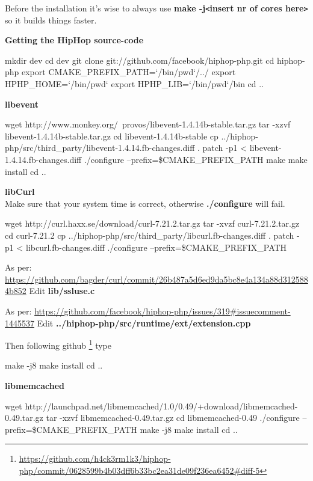 Before the installation it's wise to always use \textbf{make -j\texttt{<}insert nr of cores here\texttt{>}} so it builds things faster.

\textbf{Getting the HipHop source-code}
\begin{codelisting}
mkdir dev
cd dev
git clone git://github.com/facebook/hiphop-php.git
cd hiphop-php
export CMAKE_PREFIX_PATH=`/bin/pwd`/../
export HPHP_HOME=`/bin/pwd`
export HPHP_LIB=`/bin/pwd`/bin
cd ..
\end{codelisting}
\textbf{libevent}
\begin{codelisting}
wget http://www.monkey.org/~provos/libevent-1.4.14b-stable.tar.gz
tar -xzvf libevent-1.4.14b-stable.tar.gz
cd libevent-1.4.14b-stable
cp ../hiphop-php/src/third_party/libevent-1.4.14.fb-changes.diff .
patch -p1 < libevent-1.4.14.fb-changes.diff
./configure --prefix=\$CMAKE_PREFIX_PATH
make
make install
cd ..
\end{codelisting}
\textbf{libCurl}
\\Make sure that your system time is correct, otherwise \textbf{./configure} will fail.
\begin{codelisting}
wget http://curl.haxx.se/download/curl-7.21.2.tar.gz
tar -xvzf curl-7.21.2.tar.gz
cd curl-7.21.2
cp ../hiphop-php/src/third_party/libcurl.fb-changes.diff .
patch -p1 < libcurl.fb-changes.diff
./configure --prefix=\$CMAKE_PREFIX_PATH
\end{codelisting}

As per: \url{https://github.com/bagder/curl/commit/26b487a5d6ed9da5bc8e4a134a88d3125884b852}
Edit \textbf{lib/ssluse.c}

As per: \url{https://github.com/facebook/hiphop-php/issues/319#issuecomment-1445537}
Edit \textbf{../hiphop-php/src/runtime/ext/extension.cpp}

Then following github \footnote{\url{https://github.com/h4ck3rm1k3/hiphop-php/commit/0628599b4b03dff6b33bc2ea31de09f236ea6452\#diff-5}} type
\begin{codelisting}
make -j8
make install
cd ..
\end{codelisting}

\textbf{libmemcached}
\begin{codelisting}
wget
http://launchpad.net/libmemcached/1.0/0.49/+download/libmemcached-0.49.tar.gz
tar -xzvf libmemcached-0.49.tar.gz
cd libmemcached-0.49
./configure --prefix=\$CMAKE_PREFIX_PATH
make -j8
make install
cd ..
\end{codelisting}

